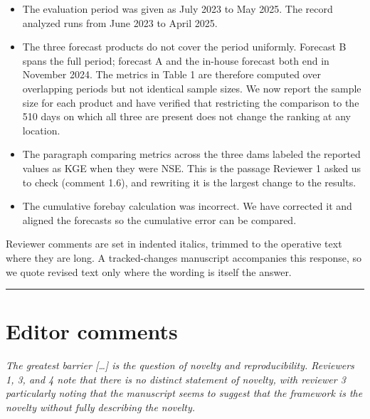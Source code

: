 \documentclass[11pt]{article}
\newenvironment{rc}%
  {\begin{list}{}{\setlength{\leftmargin}{1.5em}\setlength{\rightmargin}{1.5em}%
   \setlength{\topsep}{0.2em}\setlength{\parsep}{0pt}\setlength{\itemsep}{0pt}}%
   \item[]\itshape\color{quotegray}}%
  {\end{list}}
\begin{document}
\begin{itemize}[itemsep=0.15em]
    \item The evaluation period was given as July 2023 to May 2025. The record analyzed
    runs from June 2023 to April 2025.
    \item The three forecast products do not cover the period uniformly. Forecast B spans
    the full period; forecast A and the in-house forecast both end in November 2024. The
    metrics in Table 1 are therefore computed over overlapping periods but not identical sample sizes.
    We now report the sample size for each product and have verified that restricting the
    comparison to the 510 days on which all three are present does not change the ranking
    at any location.
    \item The paragraph comparing metrics across the three dams labeled the reported values
    as KGE when they were NSE. This is the passage Reviewer 1 asked us to check (comment
    1.6), and rewriting it is the largest change to the results.
    \item The cumulative forebay calculation was incorrect. We have corrected it and aligned
    the forecasts so the cumulative error can be compared.
\end{itemize}

Reviewer comments are set in indented italics, trimmed to the operative text where they are
long. A tracked-changes manuscript accompanies this response, so we quote revised text only
where the wording is itself the answer.

\vspace{0.4em}
\hrule
\vspace{0.4em}

\section*{Editor comments}

\begin{rc}
The greatest barrier [\ldots] is the question of novelty and reproducibility. Reviewers
1, 3, and 4 note that there is no distinct statement of novelty, with reviewer 3
particularly noting that the manuscript seems to suggest that the framework is the
novelty without fully describing the novelty.
\end{rc}
\end{document}
